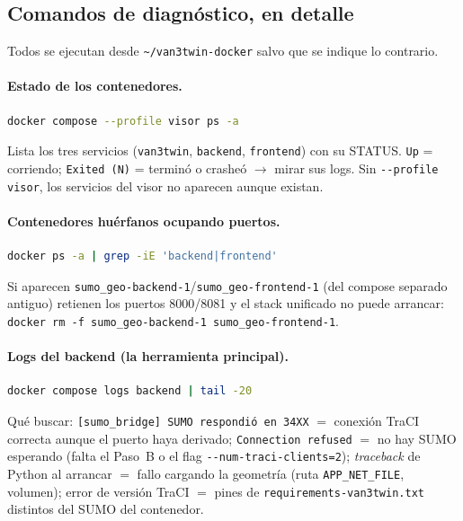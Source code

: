 \documentclass[11pt,a4paper]{article}
\begin{document}
\subsection{Comandos de diagnóstico, en detalle}

Todos se ejecutan desde \texttt{\textasciitilde/van3twin-docker} salvo que se
indique lo contrario.

\paragraph{Estado de los contenedores.}
\begin{lstlisting}[language=bash]
docker compose --profile visor ps -a
\end{lstlisting}
Lista los tres servicios (\texttt{van3twin}, \texttt{backend},
\texttt{frontend}) con su STATUS. \texttt{Up} = corriendo;
\texttt{Exited (N)} = terminó o crasheó $\rightarrow$ mirar sus logs. Sin
\texttt{-{}-profile visor}, los servicios del visor no aparecen aunque existan.

\paragraph{Contenedores huérfanos ocupando puertos.}
\begin{lstlisting}[language=bash]
docker ps -a | grep -iE 'backend|frontend'
\end{lstlisting}
Si aparecen \texttt{sumo\_geo-backend-1}/\texttt{sumo\_geo-frontend-1} (del
compose separado antiguo) retienen los puertos 8000/8081 y el stack unificado
no puede arrancar: \texttt{docker rm -f sumo\_geo-backend-1
sumo\_geo-frontend-1}.

\paragraph{Logs del backend (la herramienta principal).}
\begin{lstlisting}[language=bash]
docker compose logs backend | tail -20
\end{lstlisting}
Qué buscar: \texttt{[sumo\_bridge] SUMO respondió en 34XX} $=$ conexión TraCI
correcta aunque el puerto haya derivado; \texttt{Connection refused} $=$ no
hay SUMO esperando (falta el Paso~B o el flag
\texttt{-{}-num-traci-clients=2}); \emph{traceback} de Python al arrancar $=$
fallo cargando la geometría (ruta \texttt{APP\_NET\_FILE}, volumen); error de
versión TraCI $=$ pines de \texttt{requirements-van3twin.txt} distintos del
SUMO del contenedor.
\end{document}
